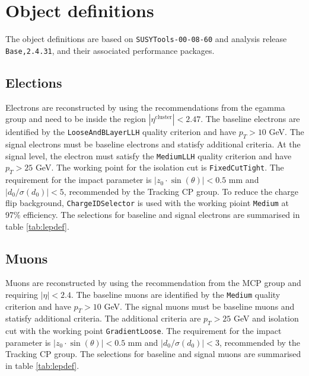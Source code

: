 \section{Object definitions}
\label{sec:object}
The object definitions are based on \texttt{SUSYTools-00-08-60} and analysis release \texttt{Base,2.4.31}, and their associated performance packages.

\subsection{Elections}
Electrons are reconstructed by using the recommendations from the egamma group and need to be inside the region $|\eta^{\text{cluster}}|<2.47$.
The baseline electrons are identified by the \texttt{LooseAndBLayerLLH} quality criterion and have $p_T>10$ GeV.
The signal electrons must be baseline electrons and statisfy additional criteria.
At the signal level, the electron must satisfy the \texttt{MediumLLH} quality criterion and have $p_T>25$ GeV.
The working point for the isolation cut is \texttt{FixedCutTight}.
The requirement for the impact parameter is $|z_0 \cdot \sin (\theta)|< 0.5$ mm and $|d_0/\sigma(d_0)|<5$, recommended by the Tracking CP group.
To reduce the charge flip background, \texttt{ChargeIDSelector} is used with the working pioint \texttt{Medium} at 97\% efficiency.
The selections for baseline and signal electrons are summarised in table \ref{tab:lepdef}.

\subsection{Muons}
Muons are reconstructed by using the recommendation from the MCP group and requiring $|\eta|<2.4$.
The baseline muons are identified by the \texttt{Medium} quality criterion and have $p_T>10$ GeV.
The signal muons must be baseline muons and statisfy additional criteria.
The additional criteria are $p_T>25$ GeV and isolation cut with the working point \texttt{GradientLoose}.
The requirement for the impact parameter is $|z_0 \cdot \sin (\theta)|< 0.5$ mm and $|d_0/\sigma(d_0)|<3$, recommended by the Tracking CP group.
The selections for baseline and signal muons are summarised in table \ref{tab:lepdef}.

